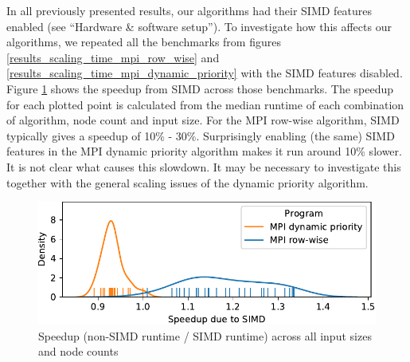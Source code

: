 In all previously presented results, our algorithms had their SIMD features enabled (see ``Hardware \& software setup''). To investigate how this affects our algorithms, we repeated all the benchmarks from figures \ref{results_scaling_time_mpi_row_wise} and \ref{results_scaling_time_mpi_dynamic_priority} with the SIMD features disabled. Figure \ref{results_simd_comparison} shows the speedup from SIMD across those benchmarks. The speedup for each plotted point is calculated from the median runtime of each combination of algorithm, node count and input size. For the MPI row-wise algorithm, SIMD typically gives a speedup of 10\% - 30\%. Surprisingly enabling (the same) SIMD features in the MPI dynamic priority algorithm makes it run around 10\% slower. It is not clear what causes this slowdown. It may be necessary to investigate this together with the general scaling issues of the dynamic priority algorithm.

\begin{figure}[hbt]\centering
  \includegraphics[width=\linewidth]{images/simd-comparison.pdf}
  \caption{Speedup (non-SIMD runtime / SIMD runtime) across all input sizes and node counts}
  \label{results_simd_comparison}
\end{figure}

% 

